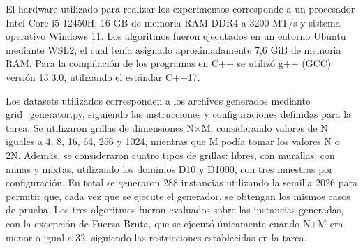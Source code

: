 El hardware utilizado para realizar los experimentos corresponde a un procesador Intel Core i5-12450H, 16 GB de memoria RAM DDR4 a 3200 MT/s y sistema operativo Windows 11. Los algoritmos fueron ejecutados en un entorno Ubuntu mediante WSL2, el cual tenía asignado aproximadamente 7,6 GiB de memoria RAM. Para la compilación de los programas en C++ se utilizó g++ (GCC) versión 13.3.0, utilizando el estándar C++17.

Los datasets utilizados corresponden a los archivos generados mediante grid\_generator.py, siguiendo las instrucciones y configuraciones definidas para la tarea. Se utilizaron grillas de dimensiones N×M, considerando valores de N iguales a 4, 8, 16, 64, 256 y 1024, mientras que M podía tomar los valores N o 2N. Además, se consideraron cuatro tipos de grillas: libres, con murallas, con minas y mixtas, utilizando los dominios D10 y D1000, con tres muestras por configuración. En total se generaron 288 instancias utilizando la semilla 2026 para permitir que, cada vez que se ejecute el generador, se obtengan los mismos casos de prueba. Los tres algoritmos fueron evaluados sobre las instancias generadas, con la excepción de Fuerza Bruta, que se ejecutó únicamente cuando N+M era menor o igual a 32, siguiendo las restricciones establecidas en la tarea.
